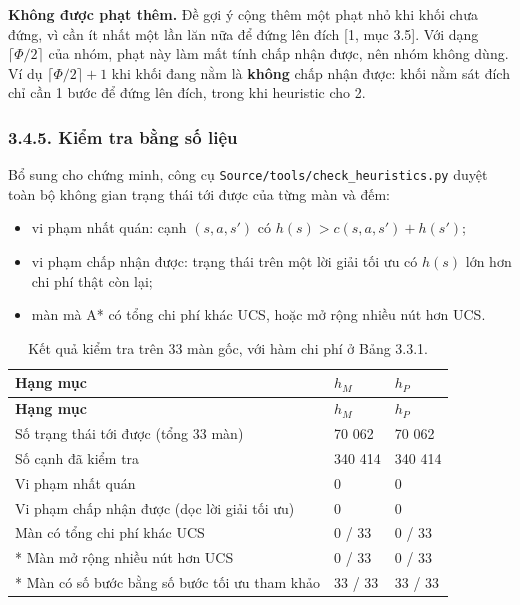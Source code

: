 \textbf{Không được phạt thêm.} Đề gợi ý cộng thêm một phạt nhỏ khi khối chưa đứng, vì cần ít nhất một lần lăn nữa để đứng lên đích {[}1, mục 3.5{]}. Với dạng \(\lceil \Phi/2 \rceil\) của nhóm, phạt này làm mất tính chấp nhận được, nên nhóm không dùng. Ví dụ \(\lceil \Phi/2 \rceil + 1\) khi khối đang nằm là \textbf{không} chấp nhận được: khối nằm sát đích chỉ cần 1 bước để đứng lên đích, trong khi heuristic cho 2.

\subsubsection{3.4.5. Kiểm tra bằng số liệu}

Bổ sung cho chứng minh, công cụ \texttt{Source/\allowbreak{}tools/\allowbreak{}check\_\allowbreak{}heuristics.\allowbreak{}py} duyệt toàn bộ không gian trạng thái tới được của từng màn và đếm:

\begin{itemize}
\tightlist
\item
  vi phạm nhất quán: cạnh \((s, a, s')\) có \(h(s) > c(s, a, s') + h(s')\);
\item
  vi phạm chấp nhận được: trạng thái trên một lời giải tối ưu có \(h(s)\) lớn hơn chi phí thật còn lại;
\item
  màn mà A* có tổng chi phí khác UCS, hoặc mở rộng nhiều nút hơn UCS.
\end{itemize}

\begin{longtable}[]{@{}lll@{}}
\caption{ Kết quả kiểm tra trên 33 màn gốc, với hàm chi phí ở Bảng 3.3.1.}\tabularnewline
\toprule\noalign{}
\rowcolor{tablehead}\textbf{Hạng mục} & \textbf{\(h_M\)} & \textbf{\(h_P\)} \\
\midrule\noalign{}
\endfirsthead
\toprule\noalign{}
\rowcolor{tablehead}\textbf{Hạng mục} & \textbf{\(h_M\)} & \textbf{\(h_P\)} \\
\midrule\noalign{}
\endhead
\bottomrule\noalign{}
\endlastfoot
Số trạng thái tới được (tổng 33 màn) & 70 062 & 70 062 \\
Số cạnh đã kiểm tra & 340 414 & 340 414 \\
Vi phạm nhất quán & 0 & 0 \\
Vi phạm chấp nhận được (dọc lời giải tối ưu) & 0 & 0 \\
Màn có tổng chi phí khác UCS & 0 / 33 & 0 / 33 \\*
Màn mở rộng nhiều nút hơn UCS & 0 / 33 & 0 / 33 \\*
Màn có số bước bằng số bước tối ưu tham khảo & 33 / 33 & 33 / 33 \\
\end{longtable}



